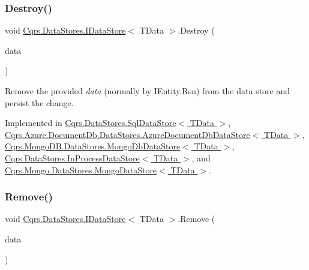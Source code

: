 \subsubsection{\texorpdfstring{Destroy()}{Destroy()}}
{\footnotesize\ttfamily void \hyperlink{interfaceCqrs_1_1DataStores_1_1IDataStore}{Cqrs.\+Data\+Stores.\+I\+Data\+Store}$<$ T\+Data $>$.Destroy (\begin{DoxyParamCaption}\item[{T\+Data}]{data }\end{DoxyParamCaption})}



Remove the provided {\itshape data}  (normally by I\+Entity.\+Rsn) from the data store and persist the change. 



Implemented in \hyperlink{classCqrs_1_1DataStores_1_1SqlDataStore_a5ec396c9eb202c8de931c1546c721ca3_a5ec396c9eb202c8de931c1546c721ca3}{Cqrs.\+Data\+Stores.\+Sql\+Data\+Store$<$ T\+Data $>$}, \hyperlink{classCqrs_1_1Azure_1_1DocumentDb_1_1DataStores_1_1AzureDocumentDbDataStore_affe39fe57e590555256258fa6c568c29_affe39fe57e590555256258fa6c568c29}{Cqrs.\+Azure.\+Document\+Db.\+Data\+Stores.\+Azure\+Document\+Db\+Data\+Store$<$ T\+Data $>$}, \hyperlink{classCqrs_1_1MongoDB_1_1DataStores_1_1MongoDbDataStore_a4650c780f34e320ba39f312e3b04555d_a4650c780f34e320ba39f312e3b04555d}{Cqrs.\+Mongo\+D\+B.\+Data\+Stores.\+Mongo\+Db\+Data\+Store$<$ T\+Data $>$}, \hyperlink{classCqrs_1_1DataStores_1_1InProcessDataStore_a1fc7a3935f52087f3703b652e77f0b75_a1fc7a3935f52087f3703b652e77f0b75}{Cqrs.\+Data\+Stores.\+In\+Process\+Data\+Store$<$ T\+Data $>$}, and \hyperlink{classCqrs_1_1Mongo_1_1DataStores_1_1MongoDataStore_af97319aef1f0484666d9ea12578b8df9_af97319aef1f0484666d9ea12578b8df9}{Cqrs.\+Mongo.\+Data\+Stores.\+Mongo\+Data\+Store$<$ T\+Data $>$}.

\mbox{\label{interfaceCqrs_1_1DataStores_1_1IDataStore_a7ef540796bbe4257296841590bc23478_a7ef540796bbe4257296841590bc23478}} 
\subsubsection{\texorpdfstring{Remove()}{Remove()}}
{\footnotesize\ttfamily void \hyperlink{interfaceCqrs_1_1DataStores_1_1IDataStore}{Cqrs.\+Data\+Stores.\+I\+Data\+Store}$<$ T\+Data $>$.Remove (\begin{DoxyParamCaption}\item[{T\+Data}]{data }\end{DoxyParamCaption})}



